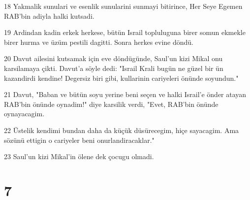 \par 18 Yakmalik sunulari ve esenlik sunularini sunmayi bitirince, Her Seye Egemen RAB'bin adiyla halki kutsadi.
\par 19 Ardindan kadin erkek herkese, bütün Israil topluluguna birer somun ekmekle birer hurma ve üzüm pestili dagitti. Sonra herkes evine döndü.
\par 20 Davut ailesini kutsamak için eve döndügünde, Saul'un kizi Mikal onu karsilamaya çikti. Davut'a söyle dedi: "Israil Krali bugün ne güzel bir ün kazandirdi kendine! Degersiz biri gibi, kullarinin cariyeleri önünde soyundun."
\par 21 Davut, "Baban ve bütün soyu yerine beni seçen ve halki Israil'e önder atayan RAB'bin önünde oynadim!" diye karsilik verdi, "Evet, RAB'bin önünde oynayacagim.
\par 22 Üstelik kendimi bundan daha da küçük düsürecegim, hiçe sayacagim. Ama sözünü ettigin o cariyeler beni onurlandiracaklar."
\par 23 Saul'un kizi Mikal'in ölene dek çocugu olmadi.

\chapter{7}

